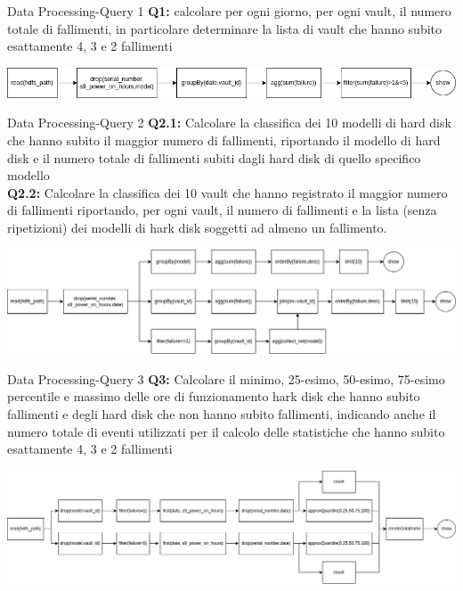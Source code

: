 \documentclass[13pt,aspectratio=169,t,xcolor=table]{beamer}
\begin{document}
\begin{frame}{Data Processing-Query 1}
    \textbf{Q1:} calcolare per ogni giorno, per ogni vault, il numero totale di fallimenti, in particolare determinare la lista di vault che hanno subito esattamente 4, 3 e 2 fallimenti
    \begin{adjustbox}{margin=0cm 0cm 0cm 2cm, center}
        \includegraphics[width=1\textwidth]{res/query1_dag.png}
    \end{adjustbox}
\end{frame}

\begin{frame}{Data Processing-Query 2}
    \textbf{Q2.1:} 
    Calcolare la classifica dei 10 modelli di hard disk che hanno subito il maggior numero di fallimenti, riportando il modello di hard disk e il numero totale di fallimenti subiti dagli hard disk di quello specifico modello\\ 
    \vspace{0.2cm}
    \textbf{Q2.2:} 
    Calcolare la classifica dei 10 vault che hanno registrato il maggior numero di fallimenti riportando, per ogni vault, il numero di fallimenti e la lista (senza ripetizioni) dei modelli di hark disk soggetti ad almeno un fallimento.
    \begin{adjustbox}{margin=0cm 0cm 0cm 0.5cm, center}
        \includegraphics[width=1\textwidth]{res/query2_dag.png}
    \end{adjustbox}
\end{frame}

\begin{frame}{Data Processing-Query 3}
    \textbf{Q3:} Calcolare il minimo, 25-esimo, 50-esimo, 75-esimo percentile e massimo delle ore di funzionamento hark disk che hanno subito fallimenti e degli hard disk che non hanno subito fallimenti, indicando anche il numero totale di eventi utilizzati per il calcolo delle statistiche che hanno subito esattamente 4, 3 e 2 fallimenti
    \begin{adjustbox}{margin=0cm 0cm 0cm 0.5cm, center}
        \includegraphics[width=1\textwidth]{res/query3_dag.png}
    \end{adjustbox}
\end{frame}
\end{document}
